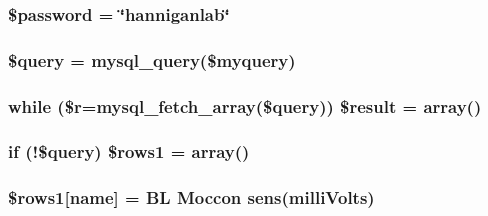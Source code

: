 \subsubsection[{\texorpdfstring{\$password}{$password}}]{\setlength{\rightskip}{0pt plus 5cm}\$password = \char`\"{}hanniganlab\char`\"{}}\hypertarget{_b_l___j_s_o_n_8php_a607686ef9f99ea7c42f4f3dd3dbb2b0d}{}\label{_b_l___j_s_o_n_8php_a607686ef9f99ea7c42f4f3dd3dbb2b0d}
\subsubsection[{\texorpdfstring{\$query}{$query}}]{\setlength{\rightskip}{0pt plus 5cm}\$query = mysql\+\_\+query(\$myquery)}\hypertarget{_b_l___j_s_o_n_8php_af59a5f7cd609e592c41dc3643efd3c98}{}\label{_b_l___j_s_o_n_8php_af59a5f7cd609e592c41dc3643efd3c98}
\subsubsection[{\texorpdfstring{\$result}{$result}}]{\setlength{\rightskip}{0pt plus 5cm}while (\$r=mysql\+\_\+fetch\+\_\+array(\$query)) \$result = array()}\hypertarget{_b_l___j_s_o_n_8php_a9148136d1e11f768be4f805d7e567da2}{}\label{_b_l___j_s_o_n_8php_a9148136d1e11f768be4f805d7e567da2}
\subsubsection[{\texorpdfstring{\$rows1}{$rows1}}]{\setlength{\rightskip}{0pt plus 5cm}if (!\$query) \$rows1 = array()}\hypertarget{_b_l___j_s_o_n_8php_a15da33e0f4006a60bff01708cb5d1428}{}\label{_b_l___j_s_o_n_8php_a15da33e0f4006a60bff01708cb5d1428}
\subsubsection[{\texorpdfstring{\$rows1}{$rows1}}]{\setlength{\rightskip}{0pt plus 5cm}\$rows1\mbox{[}\textquotesingle{}name\textquotesingle{}\mbox{]} = \textquotesingle{}BL Moccon sens(milli\+Volts)\textquotesingle{}}\hypertarget{_b_l___j_s_o_n_8php_aece741d5099bb229e07df7a57776cfaa}{}\label{_b_l___j_s_o_n_8php_aece741d5099bb229e07df7a57776cfaa}
